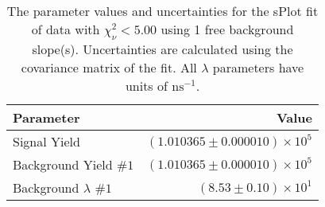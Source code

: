 
\begin{table}
    \begin{center}
        \begin{tabular}{lr}\toprule
            Parameter & Value \\\midrule
            Signal Yield & $(1.010365 \pm 0.000010) \times 10^{5}$ \\
            Background Yield $\#1$ & $(1.010365 \pm 0.000010) \times 10^{5}$ \\
            Background $\lambda$ $\#1$ & $(8.53 \pm 0.10) \times 10^{1}$ \\\bottomrule
        \end{tabular}
        \caption{The parameter values and uncertainties for the sPlot fit of data with $\chi^2_\nu < 5.00$ using 1 free background slope(s). Uncertainties are calculated using the covariance matrix of the fit. All $\lambda$ parameters have units of $\si{\nano\second}^{-1}$.}
    \end{center}
\end{table}
